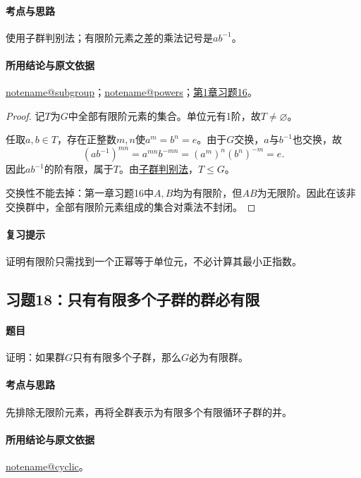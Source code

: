 \documentclass[UTF8,a4paper,11pt,fontset=windows]{ctexart}
\makeatletter
\newcommand{\noteref}[1]{\hyperref[note:#1]{\csname notename@#1\endcsname}}
\newcommand{\proofref}[2]{\hyperref[note:#1]{#2}}
\newcommand{\exref}[2]{\hyperref[ex:#1:#2]{第#1章习题#2}}
\makeatother
\begin{document}
\paragraph{考点与思路}
使用子群判别法；有限阶元素之差的乘法记号是$ab^{-1}$。

\paragraph{所用结论与原文依据}
\noteref{subgroup}；\noteref{powers}；\exref{1}{16}。


\begin{proof}
记$T$为$G$中全部有限阶元素的集合。单位元有1阶，故$T\ne\varnothing$。

任取$a,b\in T$，存在正整数$m,n$使$a^m=b^n=e$。由于$G$交换，$a$与$b^{-1}$也交换，故
\[
(ab^{-1})^{mn}=a^{mn}b^{-mn}=(a^m)^n(b^n)^{-m}=e.
\]
因此$ab^{-1}$的阶有限，属于$T$。由\proofref{subgroup}{子群判别法}，$T\leq G$。

交换性不能去掉：第一章习题16中$A,B$均为有限阶，但$AB$为无限阶。因此在该非交换群中，全部有限阶元素组成的集合对乘法不封闭。
\end{proof}

\paragraph{复习提示}
证明有限阶只需找到一个正幂等于单位元，不必计算其最小正指数。


\subsection{习题18：\texorpdfstring{只有有限多个子群的群必有限}{只有有限多个子群的群必有限}}
\label{ex:1:18}

\paragraph{题目}
证明：如果群$G$只有有限多个子群，那么$G$必为有限群。

\paragraph{考点与思路}
先排除无限阶元素，再将全群表示为有限多个有限循环子群的并。

\paragraph{所用结论与原文依据}
\noteref{cyclic}。
\end{document}
